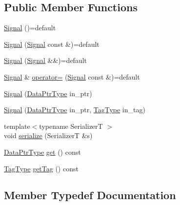 \subsection*{Public Member Functions}
\begin{DoxyCompactItemize}
\item 
\hyperlink{structvt_1_1pipe_1_1signal_1_1_signal_a019363b72392fcf448dc72194f66166f}{Signal} ()=default
\item 
\hyperlink{structvt_1_1pipe_1_1signal_1_1_signal_a5fba0db3ce0cb3e202ab3c5b7e3e2afa}{Signal} (\hyperlink{structvt_1_1pipe_1_1signal_1_1_signal}{Signal} const \&)=default
\item 
\hyperlink{structvt_1_1pipe_1_1signal_1_1_signal_aae63474ae7444649579948a543d5281a}{Signal} (\hyperlink{structvt_1_1pipe_1_1signal_1_1_signal}{Signal} \&\&)=default
\item 
\hyperlink{structvt_1_1pipe_1_1signal_1_1_signal}{Signal} \& \hyperlink{structvt_1_1pipe_1_1signal_1_1_signal_a31c544fb4732587116decd8adddc6fa3}{operator=} (\hyperlink{structvt_1_1pipe_1_1signal_1_1_signal}{Signal} const \&)=default
\item 
\hyperlink{structvt_1_1pipe_1_1signal_1_1_signal_ac0daf7c39233e5fe853ff3a4ec8f1d57}{Signal} (\hyperlink{structvt_1_1pipe_1_1signal_1_1_signal_a9c8166338314e5d595575c21eaa42859}{Data\+Ptr\+Type} in\+\_\+ptr)
\item 
\hyperlink{structvt_1_1pipe_1_1signal_1_1_signal_a6fd49ac7971cb93dd3caf0d079c30fed}{Signal} (\hyperlink{structvt_1_1pipe_1_1signal_1_1_signal_a9c8166338314e5d595575c21eaa42859}{Data\+Ptr\+Type} in\+\_\+ptr, \hyperlink{namespacevt_a84ab281dae04a52a4b243d6bf62d0e52}{Tag\+Type} in\+\_\+tag)
\item 
{\footnotesize template$<$typename SerializerT $>$ }\\void \hyperlink{structvt_1_1pipe_1_1signal_1_1_signal_a6b39c1352116ba4464740c62d340fffa}{serialize} (SerializerT \&s)
\item 
\hyperlink{structvt_1_1pipe_1_1signal_1_1_signal_a9c8166338314e5d595575c21eaa42859}{Data\+Ptr\+Type} \hyperlink{structvt_1_1pipe_1_1signal_1_1_signal_a0d6606179504be4e4c02d0ea80aec823}{get} () const
\item 
\hyperlink{namespacevt_a84ab281dae04a52a4b243d6bf62d0e52}{Tag\+Type} \hyperlink{structvt_1_1pipe_1_1signal_1_1_signal_a0d55d4712aadfc8cc848e8bd45814351}{get\+Tag} () const
\end{DoxyCompactItemize}


\subsection{Member Typedef Documentation}
\mbox{\label{structvt_1_1pipe_1_1signal_1_1_signal_a9c8166338314e5d595575c21eaa42859}} 
